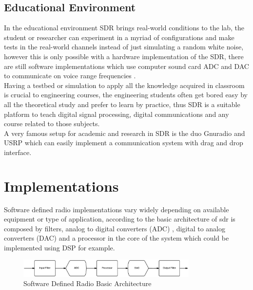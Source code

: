 \subsection{Educational Environment}

In the educational environment SDR brings real-world conditions to the lab, the
student or researcher can experiment in a myriad of configurations and make tests
in the real-world channels instead of just simulating a random white noise, however
this is only possible with a hardware implementation of the SDR, there are still
software implementations which use computer sound card ADC and DAC to communicate
on voice range frequencies \cite{ladimer2009}.\\

Having a testbed or simulation to apply all the knowledge acquired in classroom
is crucial to engineering courses, the engineering students often get bored easy
by all the theoretical study and prefer to learn by practice, thus SDR is a
suitable platform to teach digital signal processing, digital communications and
 any course related to those subjects.\\

A very famous setup for academic and research in SDR is the duo Gnuradio \cite{web:gnuradio} and
USRP \cite{web:usrp} which can easily implement a communication system with drag
and drop interface\cite{akbook}.\\


\section{Implementations}

Software defined radio implementations vary widely depending on available equipment
 or type of application, according to \cite{ladimer2009} the basic architecture of sdr is
 composed by filters, analog to digital converters (ADC) , digital to analog
 converters (DAC) and a processor in the core of the system which could be
 implemented using DSP for example.\\

 \begin{figure}[htbp]
     \centering
     \includegraphics[width=0.8\textwidth]{./figures/sdr_basic_arch}
     \caption{ Software Defined Radio Basic Architecture
     \label{fig:sdr_basic}}
 \end{figure}


